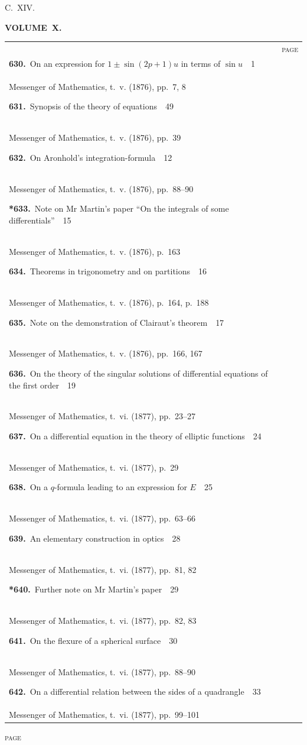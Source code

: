 \documentclass[11pt,a4paper]{book}
\newcommand{\paperentry}[4]{%
  \noindent\textbf{#1.}\ {#2}\ \dotfill\ {#3}\\[-0.2em]%
  {\small #4}\par\vspace{0.6em}%
}
\newcommand{\paperentrystar}[4]{%
  \noindent\textbf{*#1.}\ {#2}\ \dotfill\ {#3}\\[-0.2em]%
  {\small #4}\par\vspace{0.6em}%
}
\begin{document}
\thispagestyle{empty}
\noindent\hfill{\large C.~XIV.}\hfill\null\vspace{0.5em}

\begin{center}
{\Large\bfseries VOLUME~X.}
\end{center}
\vspace{0.5em}

\begin{center}
\begin{tabular}{p{4.2in}r}
& \textsc{page} \\
\paperentry{630}{On an expression for $1 \pm \sin(2p + 1)u$ in terms of $\sin u$}{1}{Messenger of Mathematics, t.~v. (1876), pp.~7, 8}
\paperentry{631}{Synopsis of the theory of equations}{49}{Messenger of Mathematics, t.~v. (1876), pp.~39}
\paperentry{632}{On Aronhold's integration-formula}{12}{Messenger of Mathematics, t.~v. (1876), pp.~88--90}
\paperentrystar{633}{Note on Mr Martin's paper ``On the integrals of some differentials''}{15}{Messenger of Mathematics, t.~v. (1876), p.~163}
\paperentry{634}{Theorems in trigonometry and on partitions}{16}{Messenger of Mathematics, t.~v. (1876), p.~164, p.~188}
\paperentry{635}{Note on the demonstration of Clairaut's theorem}{17}{Messenger of Mathematics, t.~v. (1876), pp.~166, 167}
\paperentry{636}{On the theory of the singular solutions of differential equations of the first order}{19}{Messenger of Mathematics, t.~vi. (1877), pp.~23--27}
\paperentry{637}{On a differential equation in the theory of elliptic functions}{24}{Messenger of Mathematics, t.~vi. (1877), p.~29}
\paperentry{638}{On a $q$-formula leading to an expression for $E$}{25}{Messenger of Mathematics, t.~vi. (1877), pp.~63--66}
\paperentry{639}{An elementary construction in optics}{28}{Messenger of Mathematics, t.~vi. (1877), pp.~81, 82}
\paperentrystar{640}{Further note on Mr Martin's paper}{29}{Messenger of Mathematics, t.~vi. (1877), pp.~82, 83}
\paperentry{641}{On the flexure of a spherical surface}{30}{Messenger of Mathematics, t.~vi. (1877), pp.~88--90}
\paperentry{642}{On a differential relation between the sides of a quadrangle}{33}{Messenger of Mathematics, t.~vi. (1877), pp.~99--101}
\end{tabular}
\end{center}

\newpage
\thispagestyle{fancy}
\begin{center}
{\small\textsc{page}}
\end{center}
\vspace{-0.5em}
\end{document}
